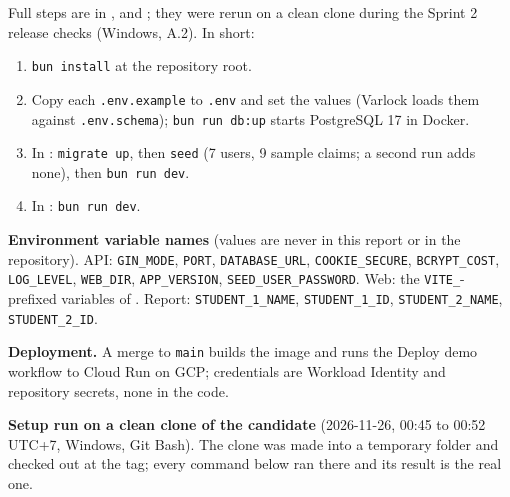 \label{E:2}

Full steps are in ,  and ; they were rerun on a clean clone during the Sprint 2 release checks (Windows, A.2). In short:

\begin{enumerate}\setlength\itemsep{2pt}
\item \texttt{bun install} at the repository root.
\item Copy each \texttt{.env.example} to \texttt{.env} and set the values (Varlock loads them against \texttt{.env.schema}); \texttt{bun run db:up} starts PostgreSQL 17 in Docker.
\item In : \texttt{migrate up}, then \texttt{seed} (7 users, 9 sample claims; a second run adds none), then \texttt{bun run dev}.
\item In : \texttt{bun run dev}.
\end{enumerate}

\textbf{Environment variable names} (values are never in this report or in the repository). API: \texttt{GIN\_MODE}, \texttt{PORT}, \texttt{DATABASE\_URL}, \texttt{COOKIE\_SECURE}, \texttt{BCRYPT\_COST}, \texttt{LOG\_LEVEL}, \texttt{WEB\_DIR}, \texttt{APP\_VERSION}, \texttt{SEED\_USER\_PASSWORD}. Web: the \texttt{VITE\_}-prefixed variables of . Report: \texttt{STUDENT\_1\_NAME}, \texttt{STUDENT\_1\_ID}, \texttt{STUDENT\_2\_NAME}, \texttt{STUDENT\_2\_ID}.

\textbf{Deployment.} A merge to \texttt{main} builds the image and runs the Deploy demo workflow to Cloud Run on GCP; credentials are Workload Identity and repository secrets, none in the code.

\textbf{Setup run on a clean clone of the candidate} (2026-11-26, 00:45 to 00:52 UTC+7, Windows, Git Bash). The clone was made into a temporary folder and checked out at the tag; every command below ran there and its result is the real one.

